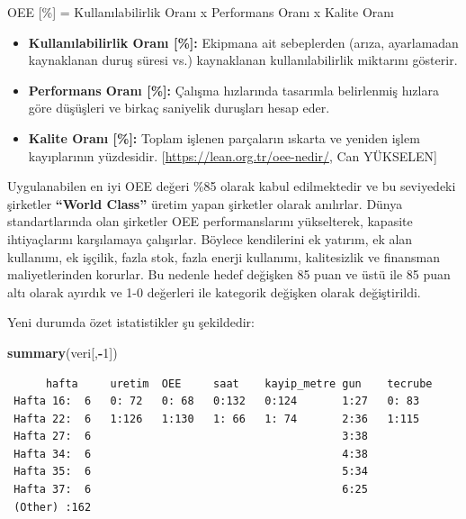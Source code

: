 \documentclass[12pt,twoside]{deuthesis}
\newenvironment{Shaded}{\begin{snugshade}}{\end{snugshade}}
\newcommand{\DecValTok}[1]{\textcolor[rgb]{0.00,0.00,0.81}{#1}}
\newcommand{\KeywordTok}[1]{\textcolor[rgb]{0.13,0.29,0.53}{\textbf{#1}}}
\newcommand{\NormalTok}[1]{#1}
\newcommand{\OperatorTok}[1]{\textcolor[rgb]{0.81,0.36,0.00}{\textbf{#1}}}
\begin{document}
OEE {[}\%{]} = Kullanılabilirlik Oranı x Performans Oranı x Kalite Oranı
\begin{itemize}
\item
  \textbf{Kullanılabilirlik Oranı {[}\%{]}:} Ekipmana ait sebeplerden (arıza, ayarlamadan kaynaklanan duruş süresi vs.) kaynaklanan kullanılabilirlik miktarını gösterir.
\item
  \textbf{Performans Oranı {[}\%{]}:} Çalışma hızlarında tasarımla belirlenmiş hızlara göre düşüşleri ve birkaç saniyelik duruşları hesap eder.
\item
  \textbf{Kalite Oranı {[}\%{]}:} Toplam işlenen parçaların ıskarta ve yeniden işlem kayıplarının yüzdesidir. {[}\url{https://lean.org.tr/oee-nedir/}, Can YÜKSELEN{]}
\end{itemize}
Uygulanabilen en iyi OEE değeri \%85 olarak kabul edilmektedir ve bu seviyedeki şirketler \textbf{``World Class''} üretim yapan şirketler olarak anılırlar. Dünya standartlarında olan şirketler OEE performanslarını yükselterek, kapasite ihtiyaçlarını karşılamaya çalışırlar. Böylece kendilerini ek yatırım, ek alan kullanımı, ek işçilik, fazla stok, fazla enerji kullanımı, kalitesizlik ve finansman maliyetlerinden korurlar. Bu nedenle hedef değişken 85 puan ve üstü ile 85 puan altı olarak ayırdık ve 1-0 değerleri ile kategorik değişken olarak değiştirildi.
\begin{Shaded}
\end{Shaded}
Yeni durumda özet istatistikler şu şekildedir:
\begin{Shaded}
\begin{Highlighting}[]
\KeywordTok{summary}\NormalTok{(veri[,}\OperatorTok{{-}}\DecValTok{1}\NormalTok{])}
\end{Highlighting}
\end{Shaded}
\begin{verbatim}
      hafta     uretim  OEE     saat    kayip_metre gun    tecrube
 Hafta 16:  6   0: 72   0: 68   0:132   0:124       1:27   0: 83  
 Hafta 22:  6   1:126   1:130   1: 66   1: 74       2:36   1:115  
 Hafta 27:  6                                       3:38          
 Hafta 34:  6                                       4:38          
 Hafta 35:  6                                       5:34          
 Hafta 37:  6                                       6:25          
 (Other) :162                                                     
\end{verbatim}
\end{document}
